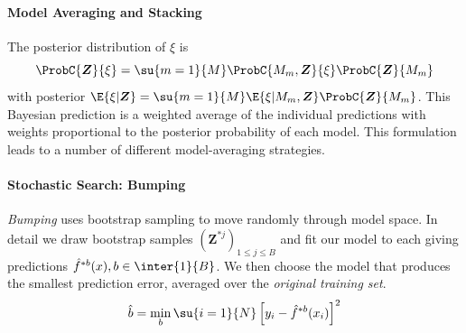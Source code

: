\paragraph{Model Averaging and Stacking}
The posterior distribution of $\xi$ is
$$ \ProbC{\bm{Z}}{\xi} = \su{{m=1}}{M}\ProbC{M_{m},\bm{Z}}{\xi}\ProbC{\bm{Z}}{M_{m}}$$
with posterior $\E{\xi|\bm{Z}} = \su{{m=1}}{M}\E{\xi|M_{m},\bm{Z}}\ProbC{\bm{Z}}{M_{m}}$.
This Bayesian prediction is a weighted average of the individual predictions with weights 
proportional to the posterior probability of each model. This formulation leads to a number
of different model-averaging strategies.

\paragraph{Stochastic Search: Bumping}
\emph{Bumping} uses bootstrap sampling to move randomly through model space. 
In detail we draw bootstrap samples $\left(\bm{Z}^{*j}\right)_{1\leq j\leq B}$ and fit our model
to each giving predictions $\hat{f}^{*b}(x), b\in\inter{1}{B}$. We then choose the model that 
produces the smallest prediction error, averaged over the \emph{original training set}.
$$ \hat{b}=\min\limits_{b}\su{{i=1}}{N}\left[y_{i}-\hat{f}^{*b}(x_{i})\right]^{2}$$
